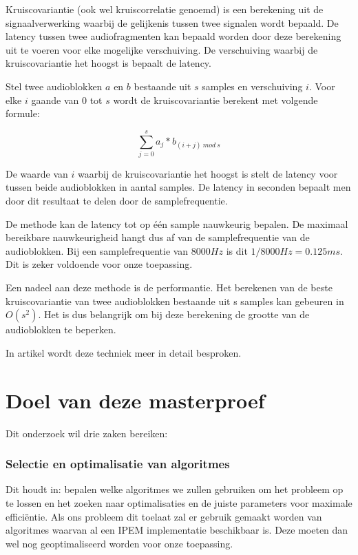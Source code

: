 Kruiscovariantie (ook wel kruiscorrelatie genoemd) is een berekening uit de signaalverwerking waarbij de gelijkenis tussen twee signalen wordt bepaald. De latency tussen twee audiofragmenten kan bepaald worden door deze berekening uit te voeren voor elke mogelijke verschuiving. De verschuiving waarbij de kruiscovariantie het hoogst is bepaalt de latency.

Stel twee audioblokken $ a $ en $ b $ bestaande uit $ s $ samples en verschuiving $ i $. Voor elke $ i $ gaande van 0 tot $ s $ wordt de kruiscovariantie berekent met volgende formule:

\begin{equation}
 \sum_{j=0}^{s} a_{j} * b_{(i+j)\ mod\ s}
\end{equation}

De waarde van $ i $ waarbij de kruiscovariantie het hoogst is stelt de latency voor tussen beide audioblokken in aantal samples. De latency in seconden bepaalt men door dit resultaat te delen door de samplefrequentie.

De methode kan de latency tot op één sample nauwkeurig bepalen. De maximaal bereikbare nauwkeurigheid hangt dus af van de samplefrequentie van de audioblokken. Bij een samplefrequentie van $8000 Hz$ is dit $ 1/8000 Hz = 0.125 ms $. Dit is zeker voldoende voor onze toepassing.

Een nadeel aan deze methode is de performantie. Het berekenen van de beste kruiscovariantie van twee audioblokken bestaande uit s samples kan gebeuren in  $O(s^{2})$. Het is dus belangrijk om bij deze berekening de grootte van de audioblokken te beperken.

In artikel \citealp{six2015multimodal} wordt deze techniek meer in detail besproken.

\section{Doel van deze masterproef}

Dit onderzoek wil drie zaken bereiken: 

\subsubsection{Selectie en optimalisatie van algoritmes}
Dit houdt in: bepalen welke algoritmes we zullen gebruiken om het probleem op te lossen en het zoeken naar optimalisaties en de juiste parameters voor maximale efficiëntie. Als ons probleem dit toelaat zal er gebruik gemaakt worden van algoritmes waarvan al een IPEM implementatie beschikbaar is. Deze moeten dan wel nog geoptimaliseerd worden voor onze toepassing. 


